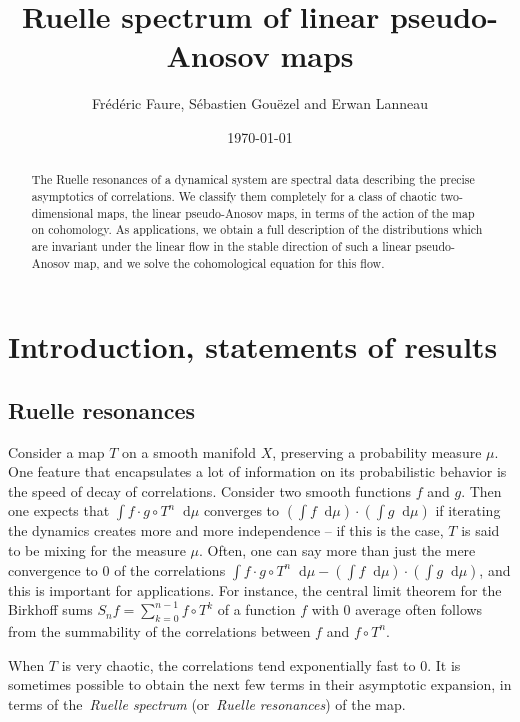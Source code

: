 \documentclass[11pt, a4paper, oneside, final, pagebackref]{amsart}
\title{Ruelle spectrum of linear pseudo-Anosov maps}
\author{Fr\'ed\'eric Faure, S\'ebastien Gou\"ezel and Erwan Lanneau}
\date{\today}
\newcommand{\dd}{\mathop{}\!\mathrm{d}}
\theoremstyle{definition}
\numberwithin{equation}{section}
\begin{document}
\begin{abstract}
The Ruelle resonances of a dynamical system are spectral data describing
the precise asymptotics of correlations. We classify them completely for a
class of chaotic two-dimensional maps, the linear pseudo-Anosov maps, in
terms of the action of the map on cohomology. As applications, we obtain a
full description of the distributions which are invariant under the linear
flow in the stable direction of such a linear pseudo-Anosov map, and we
solve the cohomological equation for this flow.
\end{abstract}

\maketitle


\tableofcontents

\section{Introduction, statements of results}

\subsection*{Ruelle resonances} Consider a map $T$ on a smooth manifold
$X$, preserving a probability measure $\mu$. One feature that encapsulates a
lot of information on its probabilistic behavior is the speed of decay of
correlations. Consider two smooth functions $f$ and $g$. Then one expects
that $\int f \cdot g \circ T^n \dd \mu$ converges to $(\int f \dd\mu) \cdot
(\int g \dd\mu)$ if iterating the dynamics creates more and more independence
-- if this is the case, $T$ is said to be mixing for the measure $\mu$.
Often, one can say more than just the mere convergence to $0$ of the
correlations $\int f \cdot g \circ T^n \dd \mu - (\int f \dd\mu) \cdot (\int
g \dd\mu)$, and this is important for applications. For instance, the central
limit theorem for the Birkhoff sums $S_n f = \sum_{k=0}^{n-1} f \circ T^k$ of
a function $f$ with $0$ average often follows from the summability of the
correlations between $f$ and $f\circ T^n$.

When $T$ is very chaotic, the correlations tend exponentially fast to $0$. It
is sometimes possible to obtain the next few terms in their asymptotic
expansion, in terms of the~\emph{Ruelle spectrum} (or~\emph{Ruelle
resonances}) of the map.
\end{document}
